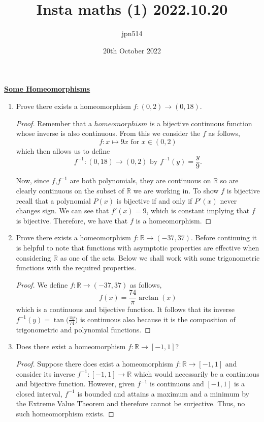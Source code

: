 \documentclass{article}
\title{Insta maths (1) 2022.10.20}
\author{jpn514 }
\date{20th October 2022}
\begin{document}
\begin{center}
\huge\underline{\textbf{Some Homeomorphisms}}\newline
\end{center}

\begin{enumerate}[label=(\roman*)]

\item 
 Prove there exists a homeomorphism $f:(0,2)\to(0,18)$.
\newline
\begin{proof}
Remember that a $homeomorphism$ is a bijective continuous function whose inverse is also continuous.
From this we consider the $f$ as follows, 
$$ f: x \mapsto 9x \text{ for } x\in(0,2) $$ which then allows us to define 
$$ f^{-1}:(0,18)\to(0,2) \text{ by } f^{-1}(y)=\frac{y}{9}\text{.} $$

Now, since $f$,$f^{-1}$ are both polynomials, they are continuous on $\mathbb{R}$ so are clearly continuous on the subset of $\mathbb{R}$ we are working in. To show $f$ is bijective recall that a polynomial $P(x)$ is bijective if and only if $P'(x)$ never changes sign. We can see that $f'(x)=9$, which is constant implying that $f$ is bijective. Therefore, we have that $f$ is a homeomorphism.
\end{proof}

\item 
Prove there exists a homeomorphism $f:\mathbb{R}\to(-37,37)$.
\newline
\newline Before continuing it is helpful to note that functions with asymptotic properties are effective when considering $\mathbb{R}$ as one of the sets. Below we shall work with some trigonometric functions with the required properties.
\begin{proof}
We define $f:\mathbb{R}\to(-37,37)$ as follows,
$$f(x)=\frac{74}{\pi}\arctan{(x)}$$ which is a continuous and bijective function. It follows that its inverse $f^{-1}(y)=\tan{\Big(\frac{\pi y}{74}\Big)}$ is continuous also because it is the composition of trigonometric and polynomial functions.
\end{proof}

\item
Does there exist a homeomorphism $f:\mathbb{R}\to[-1,1]$?
\begin{proof}
Suppose there does exist a homeomorphism $f:\mathbb{R}\to[-1,1]$ and consider its inverse \newline $f^{-1}:[-1,1]\to\mathbb{R}$ which would necessarily be a continuous and bijective function. However, given $f^{-1}$ is continuous and $[-1,1]$ is a closed interval, $f^{-1}$ is bounded and attains a maximum and a minimum by the Extreme Value Theorem and therefore cannot be surjective. Thus, no such homeomorphism exists.
\end{proof}

\end{enumerate}
\end{document}
